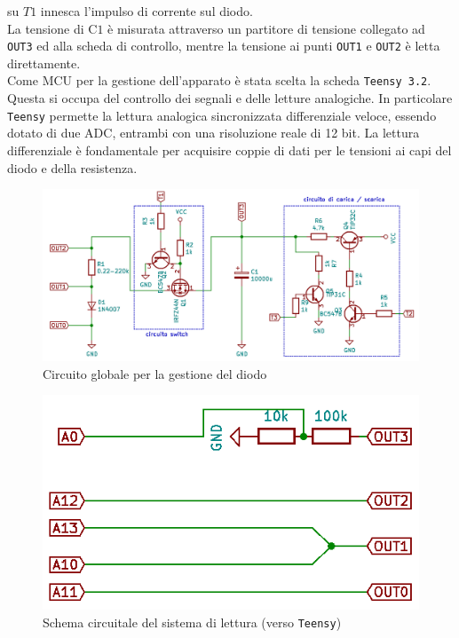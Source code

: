 \documentclass{article}[a4paper, oneside, 11pt]
\begin{document}
su $T1$ innesca l'impulso di corrente sul diodo.\\
La tensione di C$1$ è misurata attraverso un partitore di tensione collegato 
ad \verb+OUT3+ ed alla scheda di controllo, mentre la tensione ai punti
\verb+OUT1+ e \verb+OUT2+ è letta direttamente.\\
Come MCU per la gestione dell'apparato è stata scelta la scheda 
\verb+Teensy 3.2+\cite{teensy}. Questa si occupa del controllo dei segnali e 
delle letture analogiche. In particolare \verb+Teensy+ permette la lettura
analogica sincronizzata differenziale veloce, essendo dotato di due ADC,
entrambi con una risoluzione reale di 12 bit. La lettura differenziale è
fondamentale per acquisire coppie di dati per le tensioni ai capi del diodo
e della resistenza.

\begin{figure}[H]
	\centering 
 		\includegraphics[scale=0.5]{./gestione.png}
 	\caption{Circuito globale per la gestione del diodo \label{sch:gest}}
\end{figure}
\begin{figure}[H]
	\centering 
 		\includegraphics[scale=0.5]{./measure.png}
 	\caption{Schema circuitale del sistema di lettura (verso 
	\texttt{Teensy})
	\label{sch:rdng}}
\end{figure}
\end{document}
